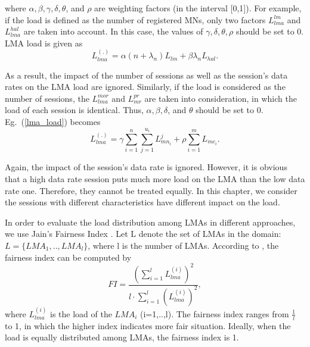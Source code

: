 where $\alpha, \beta, \gamma, \delta, \theta$, and $\rho$ are weighting factors (in the interval [0,1]). For example, if the load is defined as the number of registered MNs, only two factors $L_{lma}^{lm}$ and $L_{lma}^{hal}$ are taken into account. In this case, the values of $\gamma, \delta, \theta, \rho$ should be set to 0. LMA load is given as\\
\begin{equation}
L_{lma}^{(.)} = \alpha \left( n+ \lambda_{n} \right) L_{lm} + \beta \lambda_{n} L_{hal}. 
\label{eg:load_mn}
\end{equation}

As a result, the impact of the number of sessions as well as the session's data rates on the LMA load are ignored. Similarly, if the load is considered as the number of sessions, the $L_{lma}^{mor}$ and $L_{mr}^{pr}$ are taken into consideration, in which the load of each session is identical. Thus, $\alpha, \beta, \delta$, and $\theta$ should be set to 0. Eg.~(\ref{lma_load}) becomes  \\
\begin{equation}
L_{lma}^{(.)} = \gamma \sum_{i=1}^{n} \sum_{j=1}^{u_{i}} L_{mn_{i}}^{j} + \rho \sum_{i=1}^{m} L_{mc_{i}}. 
\end{equation}

Again, the impact of the session's data rate is ignored. However, it is obvious that a high data rate session puts much more load on the LMA than the low data rate one. Therefore, they cannot be treated equally. In this chapter, we consider the sessions with different characteristics have different impact on the load. 

In order to evaluate the load distribution among LMAs in different approaches, we use Jain's Fairness Index \cite{jain-index}. Let L denote the set of LMAs in the domain: $L=\lbrace LMA_{1},..,LMA_{l}\rbrace$, where l is the number of LMAs. According to \cite{jain-index}, the fairness index can be computed by\\
\begin{equation}
FI = \dfrac{(\sum_{i=1}^{l} L_{lma}^{(i)})^{2}}{l \cdot \sum_{i=1}^{l} (L_{lma}^{(i)})^{2}},
\end{equation} 
where $L_{lma}^{(i)}$ is the load of the $LMA_{i}$ (i=1,..,l).
The fairness index ranges from $\frac{1}{l}$ to 1, in which the higher index indicates more fair situation. Ideally, when the load is equally distributed among LMAs, the fairness index is 1.
    
